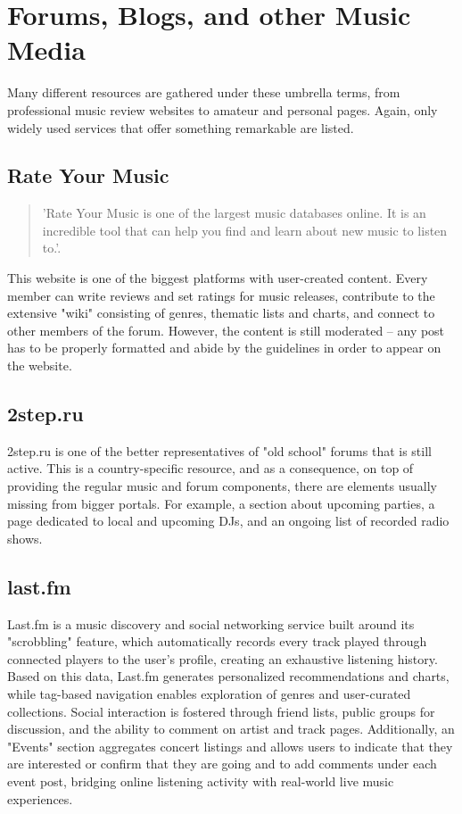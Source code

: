 \section{Forums, Blogs, and other Music Media}
Many different resources are gathered under these umbrella terms, from professional music review websites to
amateur and personal pages. Again, only widely used services that offer something remarkable are listed.

\subsection{Rate Your Music}

\begin{quote}
    'Rate Your Music is one of the largest music databases online. It is an incredible tool that
    can help you find and learn about new music to listen to.'\cite{ryt}.\\
\end{quote}
This website is one of the biggest platforms with user-created content.
Every member can write reviews and set ratings for music releases,
contribute to the extensive "wiki" consisting of genres, thematic lists and charts,
and connect to other members of the forum. However, the content is still moderated -- any post has
to be properly formatted and abide by the guidelines in order to appear on the website.

\subsection{2step.ru}
2step.ru is one of the better representatives of "old school" forums that is still active.
This is a country-specific resource, and as a consequence,
on top of providing the regular music and forum components, there are elements usually missing
from bigger portals. For example, a section about upcoming parties,
a page dedicated to local and upcoming DJs, and an ongoing list of recorded radio shows.\cite{2step}

\subsection{last.fm}
Last.fm is a music discovery and social networking service built around its "scrobbling" feature,
which automatically records every track played through connected players to the user’s profile,
creating an exhaustive listening history\cite{lastfm}.
Based on this data, Last.fm generates personalized recommendations and charts,
while tag-based navigation enables exploration of genres and user-curated collections.
Social interaction is fostered through friend lists, public groups for discussion, and the ability to comment
on artist and track pages. Additionally, an "Events" section aggregates concert listings and allows users to
indicate that they are interested or confirm that they are going and to add comments under each event post,
bridging online listening activity with real-world live music experiences.

